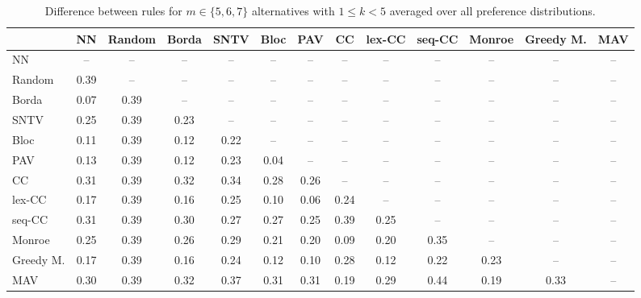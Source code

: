 
\begin{table*}[h!]
\centering
\begin{tabular}{lcccccccccccc}
\toprule
 & NN & Random & Borda & SNTV & Bloc & PAV & CC & lex-CC & seq-CC & Monroe & Greedy M. & MAV \\
\midrule
NN & -- & -- & -- & -- & -- & -- & -- & -- & -- & -- & -- & -- \\
Random & 0.39 & -- & -- & -- & -- & -- & -- & -- & -- & -- & -- & -- \\
Borda & 0.07 & 0.39 & -- & -- & -- & -- & -- & -- & -- & -- & -- & -- \\
SNTV & 0.25 & 0.39 & 0.23 & -- & -- & -- & -- & -- & -- & -- & -- & -- \\
Bloc & 0.11 & 0.39 & 0.12 & 0.22 & -- & -- & -- & -- & -- & -- & -- & -- \\
PAV & 0.13 & 0.39 & 0.12 & 0.23 & 0.04 & -- & -- & -- & -- & -- & -- & -- \\
CC & 0.31 & 0.39 & 0.32 & 0.34 & 0.28 & 0.26 & -- & -- & -- & -- & -- & -- \\
lex-CC & 0.17 & 0.39 & 0.16 & 0.25 & 0.10 & 0.06 & 0.24 & -- & -- & -- & -- & -- \\
seq-CC & 0.31 & 0.39 & 0.30 & 0.27 & 0.27 & 0.25 & 0.39 & 0.25 & -- & -- & -- & -- \\
Monroe & 0.25 & 0.39 & 0.26 & 0.29 & 0.21 & 0.20 & 0.09 & 0.20 & 0.35 & -- & -- & -- \\
Greedy M. & 0.17 & 0.39 & 0.16 & 0.24 & 0.12 & 0.10 & 0.28 & 0.12 & 0.22 & 0.23 & -- & -- \\
MAV & 0.30 & 0.39 & 0.32 & 0.37 & 0.31 & 0.31 & 0.19 & 0.29 & 0.44 & 0.19 & 0.33 & -- \\
\bottomrule
\end{tabular}

\caption{Difference between rules for $m \in \{5, 6, 7\}$ alternatives with $1 \leq k < 5$ averaged over all preference distributions.}
\end{table*}
